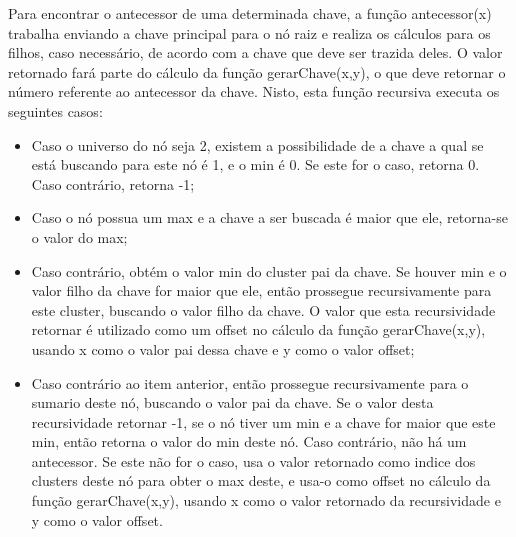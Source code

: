 \documentclass[12pt]{article}
\begin{document}
Para encontrar o antecessor de uma determinada chave, a função antecessor(x) trabalha enviando a chave principal para o nó raiz e realiza os cálculos para os filhos, caso necessário, de acordo com a chave que deve ser trazida deles. O valor retornado fará parte do cálculo da função gerarChave(x,y), o que deve retornar o número referente ao antecessor da chave. Nisto, esta função recursiva executa os seguintes casos:
\begin{itemize}
    \item Caso o universo do nó seja 2, existem a possibilidade de a chave a qual se está buscando para este nó é 1, e o min é 0. Se este for o caso, retorna 0. Caso contrário, retorna -1;
    \item Caso o nó possua um max e a chave a ser buscada é maior que ele, retorna-se o valor do max;
    \item Caso contrário, obtém o valor min do cluster pai da chave. Se houver min e o valor filho da chave for maior que ele, então prossegue recursivamente para este cluster, buscando o valor filho da chave. O valor que esta recursividade retornar é utilizado como um offset no cálculo da função gerarChave(x,y), usando x como o valor pai dessa chave e y como o valor offset;
    \item Caso contrário ao item anterior, então prossegue recursivamente para o sumario deste nó, buscando o valor pai da chave. Se o valor desta recursividade retornar -1, se o nó tiver um min e a chave for maior que este min, então retorna o valor do min deste nó. Caso contrário, não há um antecessor. Se este não for o caso, usa o valor retornado como indice dos clusters deste nó para obter o max deste, e usa-o como offset no cálculo da função gerarChave(x,y), usando x como o valor retornado da recursividade e y como o valor  offset.
\end{itemize}
\end{document}
